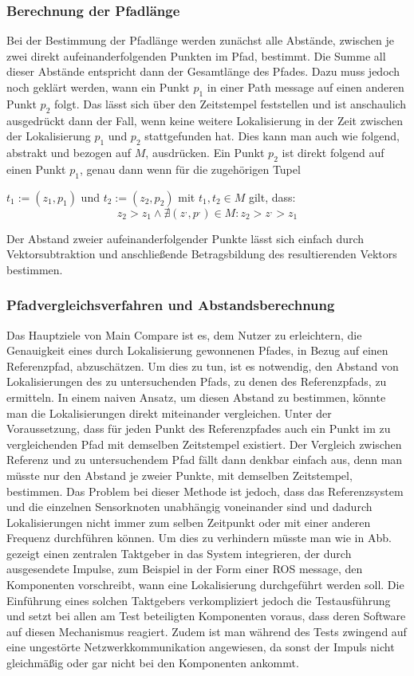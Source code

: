 \subsubsection{Berechnung der Pfadlänge}
Bei der Bestimmung der Pfadlänge werden zunächst alle Abstände, zwischen je
zwei direkt aufeinanderfolgenden Punkten im Pfad, bestimmt. Die Summe all dieser
Abstände entspricht dann der Gesamtlänge des Pfades. Dazu muss jedoch noch
geklärt werden, wann ein Punkt $p_1$ in einer Path message auf einen anderen
Punkt $p_2$ folgt. Das lässt sich über den Zeitstempel feststellen und ist
anschaulich ausgedrückt dann der Fall, wenn keine weitere Lokalisierung in
der Zeit zwischen der Lokalisierung $p_1$ und $p_2$ stattgefunden hat. Dies kann man auch wie
folgend, abstrakt und bezogen auf $M$, ausdrücken.  Ein Punkt $p_2$ ist direkt
folgend auf einen Punkt $p_1$, genau dann wenn für die zugehörigen Tupel

$t_1 := (z_1, p_1)$ und $t_2 := (z_2, p_2)$
mit
$t_1,t_2 \in M$
gilt, dass:
\[
z_2 > z_1 \wedge \nexists (z^{,}, p^{,}) \in M : z_2 > z^{,} > z_1
\]

Der Abstand zweier aufeinanderfolgender Punkte lässt sich einfach durch
Vektorsubtraktion und anschließende Betragsbildung des resultierenden Vektors
bestimmen.

\subsubsection{Pfadvergleichsverfahren und Abstandsberechnung}

Das Hauptziele von Main Compare ist es, dem Nutzer zu erleichtern, die
Genauigkeit eines durch Lokalisierung gewonnenen Pfades, in Bezug auf einen
Referenzpfad, abzuschätzen. Um dies zu tun, ist es notwendig, den Abstand von
Lokalisierungen des zu untersuchenden Pfads, zu denen des Referenzpfads, zu
ermitteln. In einem naiven Ansatz, um diesen Abstand zu bestimmen, könnte man die Lokalisierungen direkt
miteinander vergleichen. Unter der Voraussetzung, dass für jeden Punkt des Referenzpfades auch
ein Punkt im zu vergleichenden Pfad mit demselben Zeitstempel existiert. Der
Vergleich zwischen Referenz und zu untersuchendem Pfad fällt dann denkbar einfach aus, denn man müsste nur den Abstand je
zweier Punkte, mit demselben Zeitstempel, bestimmen.
Das Problem bei dieser Methode ist jedoch, dass das Referenzsystem und die
einzelnen Sensorknoten unabhängig voneinander sind und dadurch Lokalisierungen
nicht immer zum selben Zeitpunkt oder mit einer anderen Frequenz durchführen 
können. Um dies zu verhindern müsste man wie in Abb. gezeigt einen zentralen
Taktgeber in das System integrieren, der durch ausgesendete Impulse, zum
Beispiel in der Form einer ROS message, den Komponenten vorschreibt,
wann eine Lokalisierung durchgeführt werden soll.
Die Einführung eines solchen Taktgebers verkompliziert jedoch die
Testausführung und setzt bei allen am Test beteiligten Komponenten voraus, dass
deren Software auf diesen Mechanismus reagiert. Zudem ist man während des Tests
zwingend auf eine ungestörte Netzwerkkommunikation angewiesen, da sonst der
Impuls nicht gleichmäßig oder gar nicht bei den Komponenten ankommt.


